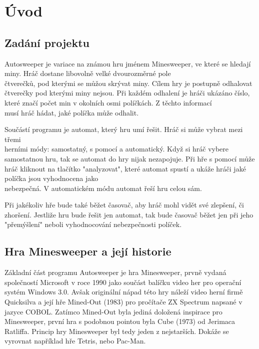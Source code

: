 \section{Úvod}
\subsection{Zadání projektu}
Autosweeper je variace na známou hru jménem Minesweeper, ve které se hledají miny. Hráč dostane libovolně velké dvourozměrné
pole \\čtverečků, pod kterými se můžou skrývat miny. Cílem hry je postupně odhalovat čtverečky pod kterými miny nejsou.
Při každém odhalení je hráči ukázáno číslo, které značí počet min v okolních osmi políčkách. Z těchto informací \\musí hráč hádat, jaké políčka může odhalit.

Součástí programu je automat, který hru umí řešit. Hráč si může vybrat mezi třemi \\herními módy: samostatný, s pomocí a
automatický. Když si hráč vybere samostatnou hru, tak se automat do hry nijak nezapojuje. Při hře s pomocí může hráč
kliknout na tlačítko "analyzovat", které automat spustí a ukáže hráči jaké políčka jsou vyhodnocena jako \\nebezpečná.
V automatickém módu automat řeší hru celou sám.

Při jakékoliv hře bude také běžet časovač, aby hráč mohl vidět své zlepšení, či zhoršení. Jestliže hru bude řešit
jen automat, tak bude časovač běžet jen při jeho "přemýšlení" neboli vyhodnocování nebezpečnosti políček.

\subsection{Hra Minesweeper a její historie}
Základní část programu Autosweeper je hra Minesweeper, prvně vydaná společností Microsoft v roce 1990 jako součást balíčku 
video her pro operační systém Windows 3.0. Avšak originální nápad této hry náleží video herní firmě Quicksilva a její hře
Mined-Out (1983) pro pročítače ZX Spectrum napsané v jazyce COBOL. Zatímco Mined-Out byla jediná doložená inspirace pro
Minesweeper, první hra s podobnou pointou byla Cube (1973) od Jerimaca Ratliffa. Princip hry Minesweeper byl tedy jeden z
nejstarších. Dokáže se vyrovnat například hře Tetris, nebo Pac-Man. \cite{minesweeperinfo}
